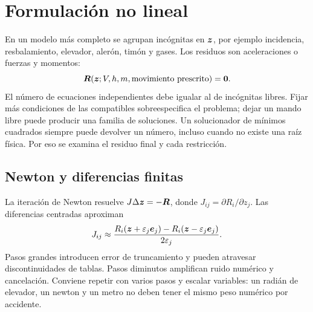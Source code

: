 
\section{Formulación no lineal}
En un modelo más completo se agrupan incógnitas en $\boldsymbol{z}$, por ejemplo incidencia, resbalamiento, elevador, alerón, timón y gases. Los residuos son aceleraciones o fuerzas y momentos:
\begin{equation}
\boldsymbol{R}(\boldsymbol{z};V,h,m,\text{movimiento prescrito})=\boldsymbol{0}.
\end{equation}
El número de ecuaciones independientes debe igualar al de incógnitas libres. Fijar más condiciones de las compatibles sobreespecifica el problema; dejar un mando libre puede producir una familia de soluciones. Un solucionador de mínimos cuadrados siempre puede devolver un número, incluso cuando no existe una raíz física. Por eso se examina el residuo final y cada restricción.

\subsection{Newton y diferencias finitas}
La iteración de Newton resuelve $J\Delta\boldsymbol{z}=-\boldsymbol{R}$, donde $J_{ij}=\partial R_i/\partial z_j$. Las diferencias centradas aproximan
\begin{equation}
J_{ij}\approx\frac{R_i(\boldsymbol{z}+\varepsilon_j\boldsymbol{e}_j)-R_i(\boldsymbol{z}-\varepsilon_j\boldsymbol{e}_j)}{2\varepsilon_j}.
\end{equation}
Pasos grandes introducen error de truncamiento y pueden atravesar discontinuidades de tablas. Pasos diminutos amplifican ruido numérico y cancelación. Conviene repetir con varios pasos y escalar variables: un radián de elevador, un newton y un metro no deben tener el mismo peso numérico por accidente.

